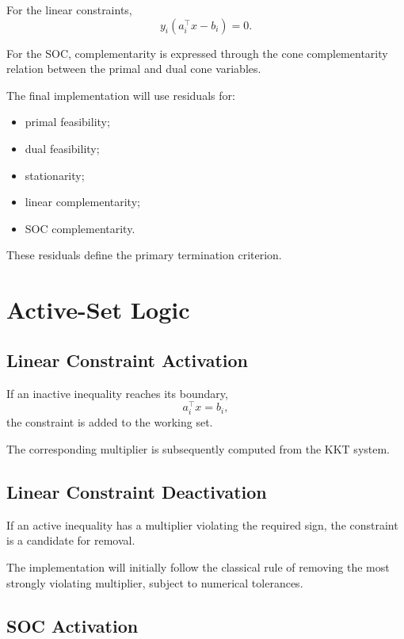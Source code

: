 \documentclass[11pt,a4paper]{article}
\begin{document}
For the linear constraints,
\[
y_i(a_i^\top x-b_i)=0.
\]

For the SOC, complementarity is expressed through the cone
complementarity relation between the primal and dual cone variables.

The final implementation will use residuals for:

\begin{itemize}
    \item primal feasibility;
    \item dual feasibility;
    \item stationarity;
    \item linear complementarity;
    \item SOC complementarity.
\end{itemize}

These residuals define the primary termination criterion.

\section{Active-Set Logic}

\subsection{Linear Constraint Activation}

If an inactive inequality reaches its boundary,
\[
a_i^\top x=b_i,
\]
the constraint is added to the working set.

The corresponding multiplier is subsequently computed from the
KKT system.

\subsection{Linear Constraint Deactivation}

If an active inequality has a multiplier violating the required sign,
the constraint is a candidate for removal.

The implementation will initially follow the classical rule of
removing the most strongly violating multiplier, subject to
numerical tolerances.

\subsection{SOC Activation}
\end{document}
